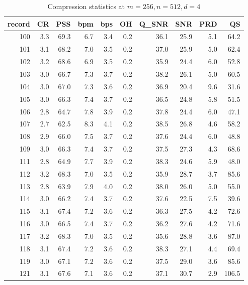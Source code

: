 \begin{table}[ht]
\tiny
\centering
\caption{Compression statistics at $m=256,n=512,d=4$}
\begin{tabular}{rrrrrrrrrr}
\toprule
 record &  CR &  PSS &  bpm &  bps &  OH &  Q\_SNR &  SNR &  PRD &    QS \\
\midrule
    100 & 3.3 & 69.3 &  6.7 &  3.4 & 0.2 &   36.1 & 25.9 &  5.1 &  64.2 \\
    101 & 3.1 & 68.2 &  7.0 &  3.5 & 0.2 &   37.0 & 25.9 &  5.0 &  62.4 \\
    102 & 3.2 & 68.6 &  6.9 &  3.5 & 0.2 &   35.9 & 24.4 &  6.0 &  52.8 \\
    103 & 3.0 & 66.7 &  7.3 &  3.7 & 0.2 &   38.2 & 26.1 &  5.0 &  60.5 \\
    104 & 3.0 & 67.0 &  7.3 &  3.6 & 0.2 &   36.9 & 20.4 &  9.6 &  31.6 \\
    105 & 3.0 & 66.3 &  7.4 &  3.7 & 0.2 &   36.5 & 24.8 &  5.8 &  51.5 \\
    106 & 2.8 & 64.7 &  7.8 &  3.9 & 0.2 &   37.8 & 24.4 &  6.0 &  47.1 \\
    107 & 2.7 & 62.5 &  8.3 &  4.1 & 0.2 &   38.5 & 26.8 &  4.6 &  58.2 \\
    108 & 2.9 & 66.0 &  7.5 &  3.7 & 0.2 &   37.6 & 24.4 &  6.0 &  48.8 \\
    109 & 3.0 & 66.3 &  7.4 &  3.7 & 0.2 &   37.5 & 27.3 &  4.3 &  68.6 \\
    111 & 2.8 & 64.9 &  7.7 &  3.9 & 0.2 &   38.3 & 24.6 &  5.9 &  48.0 \\
    112 & 3.2 & 68.3 &  7.0 &  3.5 & 0.2 &   35.9 & 28.7 &  3.7 &  85.6 \\
    113 & 2.8 & 63.9 &  7.9 &  4.0 & 0.2 &   38.0 & 26.0 &  5.0 &  55.0 \\
    114 & 3.0 & 66.2 &  7.4 &  3.7 & 0.2 &   37.6 & 22.5 &  7.5 &  39.6 \\
    115 & 3.1 & 67.4 &  7.2 &  3.6 & 0.2 &   36.3 & 27.5 &  4.2 &  72.6 \\
    116 & 3.0 & 66.5 &  7.4 &  3.7 & 0.2 &   36.2 & 27.6 &  4.2 &  71.6 \\
    117 & 3.2 & 68.3 &  7.0 &  3.5 & 0.2 &   35.6 & 28.8 &  3.6 &  87.0 \\
    118 & 3.1 & 67.4 &  7.2 &  3.6 & 0.2 &   38.3 & 27.1 &  4.4 &  69.4 \\
    119 & 3.0 & 67.1 &  7.2 &  3.6 & 0.2 &   37.5 & 29.0 &  3.6 &  85.6 \\
    121 & 3.1 & 67.6 &  7.1 &  3.6 & 0.2 &   37.1 & 30.7 &  2.9 & 106.5 \\

\end{tabular}
\end{table}
